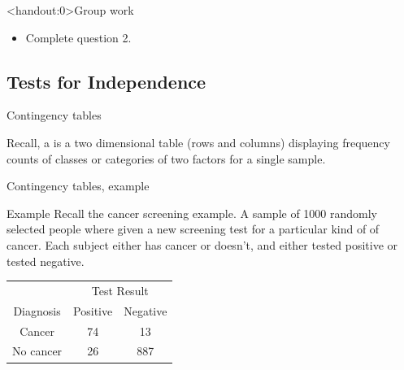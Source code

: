 \documentclass[xcolor=table, aspectratio=169, bigger]{beamer}
\begin{document}
\begin{frame}<handout:0>{Group work}
\begin{block}{}
\large
\begin{itemize}
\item Complete question 2.
\end{itemize}
\end{block}
\end{frame}

%
%
\subsection{Tests for Independence}

\begin{frame}{Contingency tables}
\begin{block}{}
Recall, a  is a two dimensional table (rows and columns) displaying frequency counts of classes or categories of two factors for a single sample.
\end{block}
\end{frame}

\begin{frame}{Contingency tables, example}
\begin{exampleblock}{Example}
Recall the cancer screening example. A sample of 1000 randomly selected people where given a new screening test for a particular kind of of cancer. Each subject either has cancer or doesn't, and either tested positive or tested negative.\\
\medskip
{\centering
\begin{tabular}{c | c  c}
\multicolumn{1}{c}{} & \multicolumn{2}{c}{Test Result}\\
Diagnosis & Positive & Negative\\
\hline
Cancer & 74 & 13\\
No cancer & 26 & 887 \\
\end{tabular}
\par}
\smallskip

\end{exampleblock}
\end{frame}
\end{document}
